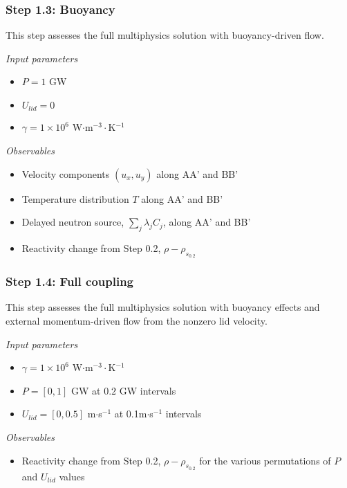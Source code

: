 \subsubsection{Step 1.3: Buoyancy}

This step assesses the full multiphysics solution with buoyancy-driven flow. 

\textit{Input parameters}
%
\begin{itemize}
    \item $P = 1$ GW
    \item $U_{lid} = 0$
    \item $\gamma = 1 \times 10^6$ W$\cdot$m$^{-3}\cdot$K$^{-1}$
\end{itemize}

\textit{Observables}
\begin{itemize}
    \item Velocity components $(u_x, u_y)$ along AA' and BB'
    \item Temperature distribution $T$ along AA' and BB'
    \item Delayed neutron source, $\sum_j \lambda_j C_j$, along AA' and BB'
    \item Reactivity change from Step 0.2, $\rho - \rho_{s_{0.2}}$
\end{itemize}

\subsubsection{Step 1.4: Full coupling}

This step assesses the full multiphysics solution with buoyancy effects
and external momentum-driven flow from the nonzero lid velocity.

\textit{Input parameters}
%
\begin{itemize}
    \item $\gamma = 1 \times 10^6$ W$\cdot$m$^{-3}\cdot$K$^{-1}$
    \item $P = [0, 1]$ GW at $0.2$ GW intervals
    \item $U_{lid} = [0, 0.5]$ m$\cdot$s$^{-1}$ at 0.1m$\cdot$s$^{-1}$
    intervals
\end{itemize}

\textit{Observables}
\begin{itemize}
    \item Reactivity change from Step 0.2, $\rho - \rho_{s_{0.2}}$ for the
    various permutations of $P$ and $U_{lid}$ values
\end{itemize}

